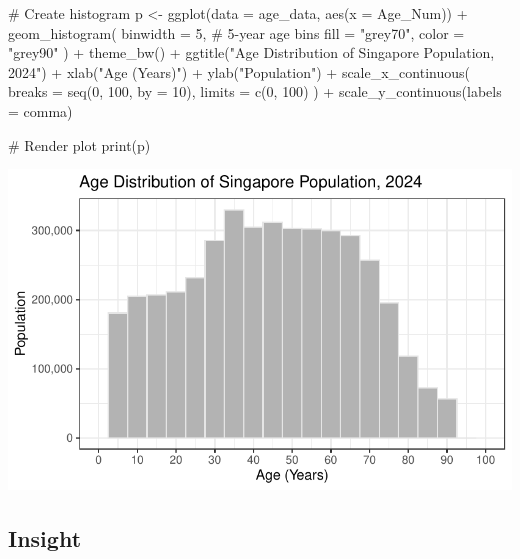 \documentclass[
  letterpaper,
  DIV=11,
  numbers=noendperiod]{scrartcl}
\newenvironment{Shaded}{\begin{snugshade}}{\end{snugshade}}
\newcommand{\AttributeTok}[1]{\textcolor[rgb]{0.40,0.45,0.13}{#1}}
\newcommand{\CommentTok}[1]{\textcolor[rgb]{0.37,0.37,0.37}{#1}}
\newcommand{\DecValTok}[1]{\textcolor[rgb]{0.68,0.00,0.00}{#1}}
\newcommand{\FunctionTok}[1]{\textcolor[rgb]{0.28,0.35,0.67}{#1}}
\newcommand{\NormalTok}[1]{\textcolor[rgb]{0.00,0.23,0.31}{#1}}
\newcommand{\OtherTok}[1]{\textcolor[rgb]{0.00,0.23,0.31}{#1}}
\newcommand{\SpecialCharTok}[1]{\textcolor[rgb]{0.37,0.37,0.37}{#1}}
\newcommand{\StringTok}[1]{\textcolor[rgb]{0.13,0.47,0.30}{#1}}
\begin{document}
\begin{Shaded}
\begin{Highlighting}[]
\CommentTok{\# Create histogram}
\NormalTok{p }\OtherTok{\textless{}{-}} \FunctionTok{ggplot}\NormalTok{(}\AttributeTok{data =}\NormalTok{ age\_data, }\FunctionTok{aes}\NormalTok{(}\AttributeTok{x =}\NormalTok{ Age\_Num)) }\SpecialCharTok{+}
  \FunctionTok{geom\_histogram}\NormalTok{(}
    \AttributeTok{binwidth =} \DecValTok{5}\NormalTok{,  }\CommentTok{\# 5{-}year age bins}
    \AttributeTok{fill =} \StringTok{"grey70"}\NormalTok{,}
    \AttributeTok{color =} \StringTok{"grey90"}
\NormalTok{  ) }\SpecialCharTok{+}
  \FunctionTok{theme\_bw}\NormalTok{() }\SpecialCharTok{+}
  \FunctionTok{ggtitle}\NormalTok{(}\StringTok{"Age Distribution of Singapore Population, 2024"}\NormalTok{) }\SpecialCharTok{+}
  \FunctionTok{xlab}\NormalTok{(}\StringTok{"Age (Years)"}\NormalTok{) }\SpecialCharTok{+}
  \FunctionTok{ylab}\NormalTok{(}\StringTok{"Population"}\NormalTok{) }\SpecialCharTok{+}
  \FunctionTok{scale\_x\_continuous}\NormalTok{(}
    \AttributeTok{breaks =} \FunctionTok{seq}\NormalTok{(}\DecValTok{0}\NormalTok{, }\DecValTok{100}\NormalTok{, }\AttributeTok{by =} \DecValTok{10}\NormalTok{),}
    \AttributeTok{limits =} \FunctionTok{c}\NormalTok{(}\DecValTok{0}\NormalTok{, }\DecValTok{100}\NormalTok{)}
\NormalTok{  ) }\SpecialCharTok{+}
  \FunctionTok{scale\_y\_continuous}\NormalTok{(}\AttributeTok{labels =}\NormalTok{ comma)}

\CommentTok{\# Render plot}
\FunctionTok{print}\NormalTok{(p)}
\end{Highlighting}
\end{Shaded}

\includegraphics{Take-home_Ex01_files/figure-pdf/unnamed-chunk-10-1.pdf}

\subsection{Insight}\label{insight-1}
\end{document}
